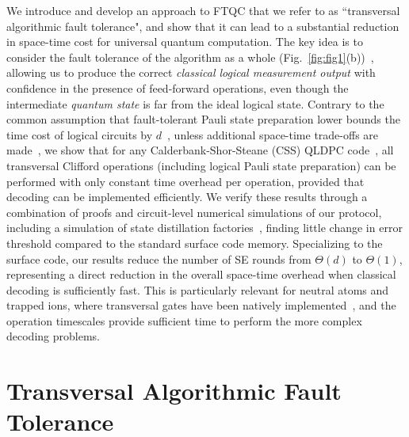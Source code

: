 \documentclass[prl,twocolumn,superscriptaddress,secnumarabic,balancelastpage,amsmath,amssymb]{revtex4-2}
\begin{document}
We introduce and develop an approach to FTQC that we refer to as ``transversal algorithmic fault tolerance", and show that it can lead to a substantial reduction in space-time cost for universal quantum computation.
%
The key idea is to consider the fault tolerance of the algorithm as a whole (Fig.~\ref{fig:fig1}(b))~\cite{delfosse2023spacetime,gidney2021stim,gottesman2022opportunities}, allowing us to produce the correct \textit{classical logical measurement output} with confidence in the presence of feed-forward operations, even though the intermediate \textit{quantum state} is far from the ideal logical state.
%
Contrary to the common assumption that fault-tolerant Pauli state preparation lower bounds the time cost of logical circuits by $d$~\cite{dennis2002topological,beverland2021cost,cai2023looped,duckering2020virtualized}, unless additional space-time trade-offs are made~\cite{raussendorf2005quantum}, we show that for any Calderbank-Shor-Steane (CSS) QLDPC code~\cite{steane1996error,calderbank1996good}, all transversal Clifford operations (including logical Pauli state preparation) can be performed with only constant time overhead per operation, provided that decoding can be implemented efficiently.
%
We verify these results through a combination of proofs and circuit-level numerical simulations of our protocol, including a simulation of state distillation factories~\cite{bravyi2005universal,fowler2012surface}, finding little change in error threshold compared to the standard surface code memory.
%
Specializing to the surface code, our results reduce the number of SE rounds from $\Theta(d)$ to $\Theta(1)$,
%
representing a direct reduction in the overall space-time overhead when classical decoding is sufficiently fast.
%
This is particularly relevant for neutral atoms and trapped ions, where transversal gates have been natively implemented~\cite{postler2022demonstration,ryan-anderson2022implementing,bluvstein2024logical}, and the operation timescales provide sufficient time to perform the more complex decoding problems.

\section*{Transversal Algorithmic Fault Tolerance}
\end{document}
